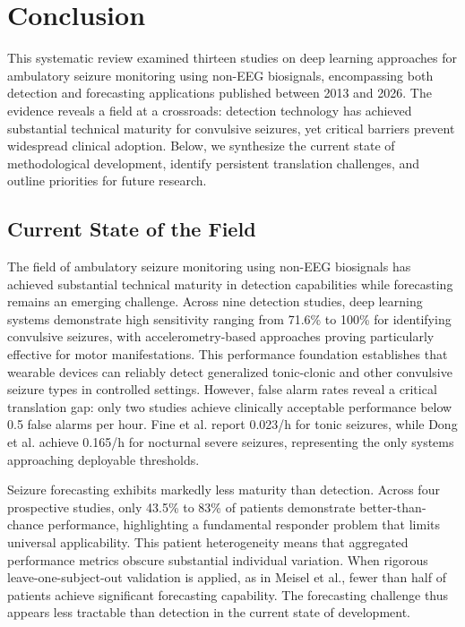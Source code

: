 \section{Conclusion}

This systematic review examined thirteen studies on deep learning approaches for ambulatory seizure monitoring using non-EEG biosignals, encompassing both detection and forecasting applications published between 2013 and 2026. The evidence reveals a field at a crossroads: detection technology has achieved substantial technical maturity for convulsive seizures, yet critical barriers prevent widespread clinical adoption. Below, we synthesize the current state of methodological development, identify persistent translation challenges, and outline priorities for future research.

\subsection{Current State of the Field}

The field of ambulatory seizure monitoring using non-EEG biosignals has achieved substantial technical maturity in detection capabilities while forecasting remains an emerging challenge. Across nine detection studies, deep learning systems demonstrate high sensitivity ranging from 71.6\% to 100\% for identifying convulsive seizures, with accelerometry-based approaches proving particularly effective for motor manifestations. This performance foundation establishes that wearable devices can reliably detect generalized tonic-clonic and other convulsive seizure types in controlled settings. However, false alarm rates reveal a critical translation gap: only two studies achieve clinically acceptable performance below 0.5 false alarms per hour. Fine et al. report 0.023/h for tonic seizures, while Dong et al. achieve 0.165/h for nocturnal severe seizures, representing the only systems approaching deployable thresholds.

Seizure forecasting exhibits markedly less maturity than detection. Across four prospective studies, only 43.5\% to 83\% of patients demonstrate better-than-chance performance, highlighting a fundamental responder problem that limits universal applicability. This patient heterogeneity means that aggregated performance metrics obscure substantial individual variation. When rigorous leave-one-subject-out validation is applied, as in Meisel et al., fewer than half of patients achieve significant forecasting capability. The forecasting challenge thus appears less tractable than detection in the current state of development.

